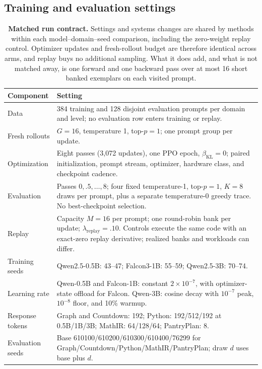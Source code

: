 \documentclass{article}
\newcommand{\1}{\mathbf 1}
\theoremstyle{remark}
\theoremstyle{definition}
\theoremstyle{plain}
\begin{document}
\subsection{Training and evaluation settings}
\label{app:repro-run-contract}
\label{app:comparison-design}

\begin{table}[H]
  \centering
  \caption{\textbf{Matched run contract.} Settings and systems changes are
  shared by methods within each model--domain--seed comparison, including
  the zero-weight replay control. Optimizer updates and fresh-rollout budget
  are therefore identical across arms, and replay buys no additional sampling.
  What it does add, and what is not matched away, is one forward and one
  backward pass over at most 16 short banked exemplars on each visited prompt.}
  \label{tab:run-contract}
  \small
  \begin{tabularx}{\linewidth}{@{}P{.23\linewidth}Y@{}}
    \toprule
    \textbf{Component} & \textbf{Setting} \\
    \midrule
    Data & 384 training and 128 disjoint evaluation prompts per domain and
      level; no evaluation row enters training or replay. \\
    Fresh rollouts & $G=16$, temperature 1, top-$p=1$; one prompt group per update. \\
    Optimization & Eight passes (3,072 updates), one PPO epoch,
      $\beta_{\mathrm{KL}}=0$; paired initialization, prompt stream,
      optimizer, hardware class, and checkpoint cadence. \\
    Evaluation & Passes $0,.5,\ldots,8$; four fixed temperature-1,
      top-$p=1$, $K=8$ draws per prompt, plus a separate temperature-0
      greedy trace. No best-checkpoint selection. \\
    Replay & Capacity $M=16$ per prompt; one round-robin bank per update;
      $\lambda_{\mathrm{replay}}=.10$. Controls execute the same code with
      an exact-zero replay derivative; realized banks and workloads can differ. \\
    Training seeds & Qwen2.5-0.5B: 43--47; Falcon3-1B: 55--59;
      Qwen2.5-3B: 70--74. \\
    Learning rate & Qwen-0.5B and Falcon-1B: constant $2\times10^{-7}$,
      with optimizer-state offload for Falcon. Qwen-3B: cosine decay with
      $10^{-7}$ peak, $10^{-8}$ floor, and 10\% warmup. \\
    Response tokens & Graph and Countdown: 192; Python: 192/512/192
      at 0.5B/1B/3B; MathIR: 64/128/64; PantryPlan: 8. \\
    Evaluation seeds & Base 610100/610200/610300/610400/76299 for
      Graph/Countdown/Python/MathIR/PantryPlan; draw $d$ uses base plus $d$. \\
    \bottomrule
  \end{tabularx}
\end{table}
\end{document}
